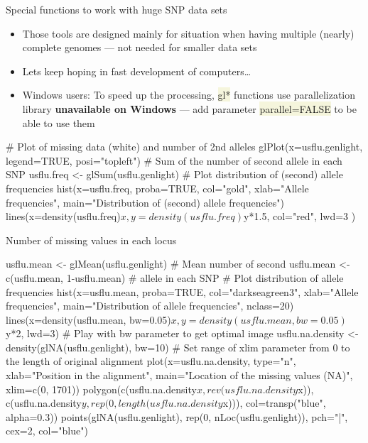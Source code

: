 \documentclass[compress, xelatex, 11pt, xcolor=svgnames, aspectratio=169,
	hyperref={
		bookmarks=true,
		unicode=true,
		colorlinks=true,
		pdftitle={Molecular data in R},
		plainpages=false,
		pdfauthor={Vojtech Zeisek},
		pdfsubject={Course about phylogeny and evolution in R},
		pdfcreator={XeLaTeX},
		pdfkeywords={R, evolution, phylogeny, molecular data},
		linkcolor=Crimson, %
		anchorcolor=Magenta, %
		citecolor=Magenta, %
		filecolor=Magenta, %
		menucolor=Magenta, %
		urlcolor=DodgerBlue, %
		},
	url={hyphens, lowtilde} %
	]{beamer}
\renewcommand{\texttt}[1]{\colorbox{Beige}{{\ttfamily #1}}}
\begin{document}
\begin{frame}[fragile]{Special functions to work with huge SNP data sets}
	\begin{itemize}
		\item Those tools are designed mainly for situation when having multiple (nearly) complete genomes --- not needed for smaller data sets
		\item Lets keep hoping in fast development of computers\ldots
		\item \alert{Windows users:} To speed up the processing, \texttt{gl*} functions use parallelization library \textbf{unavailable on Windows} --- add parameter \texttt{parallel=FALSE} to be able to use them
	\end{itemize}
	\begin{spluscode}
    # Plot of missing data (white) and number of 2nd alleles
    glPlot(x=usflu.genlight, legend=TRUE, posi="topleft")
    # Sum of the number of second allele in each SNP
    usflu.freq <- glSum(usflu.genlight)
    # Plot distribution of (second) allele frequencies
    hist(x=usflu.freq, proba=TRUE, col="gold", xlab="Allele frequencies",
      main="Distribution of (second) allele frequencies")
    lines(x=density(usflu.freq)$x, y=density(usflu.freq)$y*1.5, col="red",
      lwd=3 )
	\end{spluscode}
\end{frame}

\begin{frame}[fragile]{Number of missing values in each locus}
	\begin{spluscode}
    usflu.mean <- glMean(usflu.genlight)      # Mean number of second
    usflu.mean <- c(usflu.mean, 1-usflu.mean) # allele in each SNP
    # Plot distribution of allele frequencies
    hist(x=usflu.mean, proba=TRUE, col="darkseagreen3", xlab="Allele
      frequencies", main="Distribution of allele frequencies", nclass=20)
    lines(x=density(usflu.mean, bw=0.05)$x, y=density(usflu.mean, bw=0.05)$y*2,
      lwd=3)
    # Play with bw parameter to get optimal image
    usflu.na.density <- density(glNA(usflu.genlight), bw=10)
    # Set range of xlim parameter from 0 to the length of original alignment
    plot(x=usflu.na.density, type="n", xlab="Position in the alignment",
      main="Location of the missing values (NA)", xlim=c(0, 1701))
    polygon(c(usflu.na.density$x, rev(usflu.na.density$x)),
      c(usflu.na.density$y, rep(0, length(usflu.na.density$x))),
      col=transp("blue", alpha=0.3))
    points(glNA(usflu.genlight), rep(0, nLoc(usflu.genlight)), pch="|", cex=2,
      col="blue")
	\end{spluscode}
\end{frame}
\end{document}
